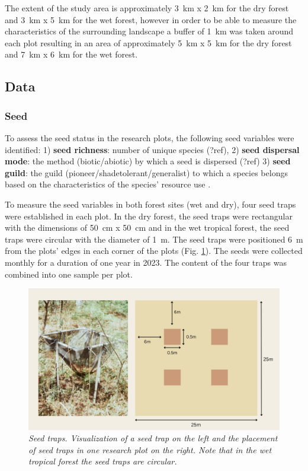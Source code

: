 The extent of the study area is approximately 3~km x 2~km for the dry forest and 3~km x 5~km for the wet forest, however in order to be able to measure the characteristics of the surrounding landscape a buffer of 1~km was taken around each plot resulting in an area of approximately 5~km x 5~km for the dry forest and 7~km x 6~km for the wet forest.

\subsection{Data}

\subsubsection{Seed}
To assess the seed status in the research plots, the following seed variables were identified: 1) \textbf{seed richness}: number of unique species (?ref), 2) \textbf{seed dispersal mode}: the method (biotic/abiotic) by which a seed is dispersed (?ref)  3) \textbf{seed guild}: the guild (pioneer/shadetolerant/generalist) to which a species belongs based on the characteristics of the species' resource use \citep{blondelGuildsFunctionalGroups2003}. 

To measure the seed variables in both forest sites (wet and dry), four seed traps were established in each plot. In the dry forest, the seed traps were rectangular with the dimensions of 50~cm x 50~cm and in the wet tropical forest, the seed traps were circular with the diameter of 1~m. The seed traps were positioned 6~m from the plots’ edges in each corner of the plots (Fig. \ref{fig:st}). The seeds were collected monthly for a duration of one year in 2023. The content of the four traps was combined into one sample per plot.

\begin{figure}[htbp]
\centering
\includegraphics[width=\linewidth, keepaspectratio]{Report/figures/02_seedtraps.pdf}
\caption{\textit{Seed traps. Visualization of a seed trap on the left and the placement of seed traps in one research plot on the right. Note that in the wet tropical forest the seed traps are circular.}}
\label{fig:st}
\end{figure}

